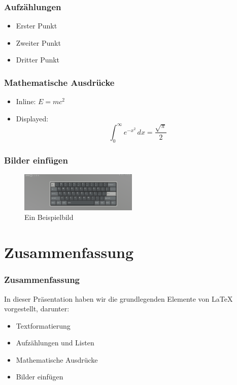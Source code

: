 \documentclass{beamer}
\begin{document}
\begin{frame}
    \frametitle{Aufzählungen}
    \begin{itemize}
        \item Erster Punkt
        \item Zweiter Punkt
        \item Dritter Punkt
    \end{itemize}
\end{frame}

\begin{frame}
    \frametitle{Mathematische Ausdrücke}
    \begin{itemize}
        \item Inline: \(E = mc^2\)
        \item Displayed:
              \[
                  \int_0^\infty e^{-x^2} \, dx = \frac{\sqrt{\pi}}{2}
              \]
    \end{itemize}
\end{frame}

\begin{frame}
    \frametitle{Bilder einfügen}
    \begin{figure}
        \centering
        \includegraphics[width=0.5\textwidth]{sample}
        \caption{Ein Beispielbild}
    \end{figure}
\end{frame}

\section{Zusammenfassung}

\begin{frame}
    \frametitle{Zusammenfassung}
    In dieser Präsentation haben wir die grundlegenden Elemente von LaTeX vorgestellt, darunter:
    \begin{itemize}
        \item Textformatierung
        \item Aufzählungen und Listen
        \item Mathematische Ausdrücke
        \item Bilder einfügen
    \end{itemize}
\end{frame}
\end{document}
